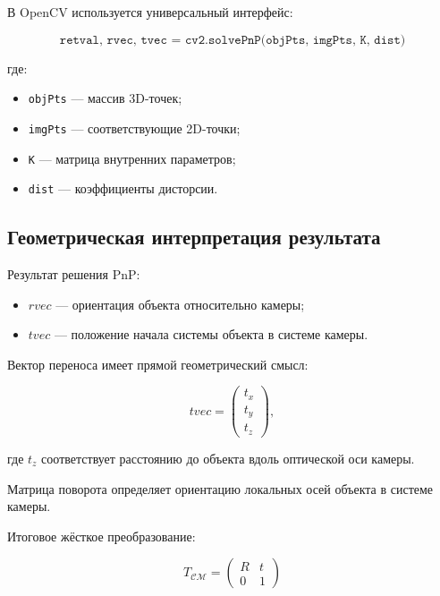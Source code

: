 \documentclass[a4paper,12pt]{article}
\begin{document}
В OpenCV используется универсальный интерфейс:

\begin{equation*}
\texttt{retval, rvec, tvec = cv2.solvePnP(objPts, imgPts, K, dist)}
\end{equation*}

где:
\begin{itemize}
    \item \texttt{objPts} --- массив 3D-точек;
    \item \texttt{imgPts} --- соответствующие 2D-точки;
    \item \texttt{K} --- матрица внутренних параметров;
    \item \texttt{dist} --- коэффициенты дисторсии.
\end{itemize}

\subsection*{Геометрическая интерпретация результата}

Результат решения PnP:

\begin{itemize}
    \item $rvec$ --- ориентация объекта относительно камеры;
    \item $tvec$ --- положение начала системы объекта в системе камеры.
\end{itemize}

Вектор переноса имеет прямой геометрический смысл:

\begin{equation}
tvec =
\begin{pmatrix}
t_x \\
t_y \\
t_z
\end{pmatrix},
\end{equation}

где $t_z$ соответствует расстоянию до объекта вдоль оптической оси камеры.

Матрица поворота определяет ориентацию локальных осей объекта в системе камеры.

Итоговое жёсткое преобразование:

\begin{equation}
T_{\mathcal{C}\mathcal{M}} =
\begin{pmatrix}
R & t \\
0 & 1
\end{pmatrix}
\label{eq:final_transform}
\end{equation}
\end{document}

